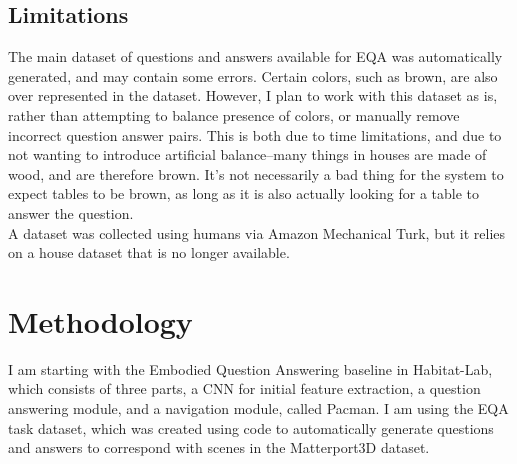 \documentclass{article}
\begin{document}
\subsection{Limitations}
The main dataset of questions and answers available for EQA was automatically generated, and may contain some errors. Certain colors, such as brown, are also over represented in the dataset.  However, I plan to work with this dataset as is, rather than attempting to balance presence of colors, or manually remove incorrect question answer pairs. This is both due to time limitations, and due to not wanting to introduce artificial balance--many things in houses are made of wood, and are therefore brown. It's not necessarily a bad thing for the system to expect tables to be brown, as long as it is also actually looking for a table to answer the question. \\
A dataset was collected using humans via Amazon Mechanical Turk, but it relies on a house dataset that is no longer available. 
 

\section{Methodology}
I am starting with the Embodied Question Answering baseline in Habitat-Lab, which consists of three parts, a CNN for initial feature extraction, a question answering module, and a navigation module, called Pacman\cite{habitat}\cite{embodiedqa}. I am using the EQA task dataset, which was created using code to automatically generate questions and answers to correspond with scenes in the Matterport3D dataset\cite{matterport}.
\end{document}
